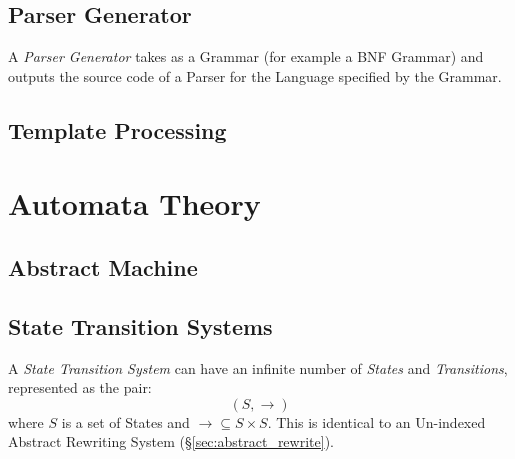 \subsection{Parser Generator}\label{sec:parser_generator}

A \emph{Parser Generator} takes as a Grammar (for example a BNF
Grammar) and outputs the source code of a Parser for the Language
specified by the Grammar.



\subsection{Template Processing}\label{sec:template_processing}



\section{Automata Theory}\label{sec:automata_theory}


\subsection{Abstract Machine} \label{sec:abstract_machine}

\subsection{State Transition Systems} \label{sec:state_transition_system}

A \emph{State Transition System} can have an infinite number of
\emph{States} and \emph{Transitions}, represented as the pair:
\[
  (S,\rightarrow)
\]
where $S$ is a set of States and $\rightarrow \subseteq S \times S$.
This is identical to an Un-indexed Abstract Rewriting System
(\S\ref{sec:abstract_rewrite}).

